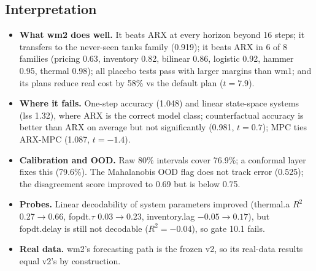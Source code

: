 \documentclass[10pt,a4paper]{extarticle}
\begin{document}
\subsection{Interpretation}
\begin{itemize}
\item \textbf{What wm2 does well.} It beats ARX at every horizon beyond 16 steps; it transfers to the never-seen tanks family
(0.919); it beats ARX in 6 of 8 families (pricing 0.63, inventory 0.82, bilinear 0.86, logistic 0.92, hammer 0.95, thermal 0.98);
all placebo tests pass with larger margins than wm1; and its plans reduce real cost by 58\% vs the default plan ($t=7.9$).
\item \textbf{Where it fails.} One-step accuracy (1.048) and linear state-space systems (lss 1.32), where ARX is the correct model
class; counterfactual accuracy is better than ARX on average but not significantly (0.981, $t=0.7$); MPC ties ARX-MPC (1.087,
$t=-1.4$).
\item \textbf{Calibration and OOD.} Raw 80\% intervals cover 76.9\%; a conformal layer fixes this (79.6\%). The Mahalanobis OOD flag
does not track error (0.525); the disagreement score improved to 0.69 but is below 0.75.
\item \textbf{Probes.} Linear decodability of system parameters improved (thermal.a $R^2$ 0.27$\to$0.66, fopdt.$\tau$ 0.03$\to$0.23,
inventory.lag $-0.05\to0.17$), but fopdt.delay is still not decodable ($R^2=-0.04$), so gate 10.1 fails.
\item \textbf{Real data.} wm2's forecasting path is the frozen v2, so its real-data results equal v2's by construction.
\end{itemize}

\end{document}
